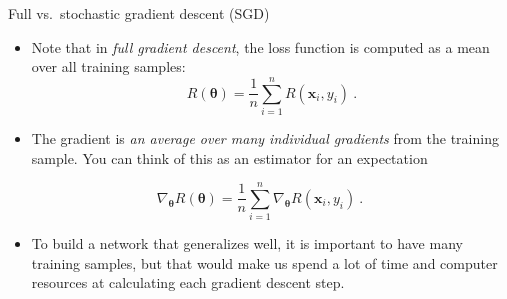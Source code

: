 \documentclass[
  10pt,
  ignorenonframetext,
]{beamer}
\providecommand{\tightlist}{%
  \setlength{\itemsep}{0pt}\setlength{\parskip}{0pt}}
\begin{document}
\begin{frame}
\begin{block}{Full vs.~stochastic gradient descent (SGD)}
\protect\hypertarget{full-vs.-stochastic-gradient-descent-sgd}{}
\(~\)

\begin{itemize}
\item
  Note that in \emph{full gradient descent}, the loss function is
  computed as a mean over all training samples: \[
  R({\boldsymbol \theta})=\frac{1}{n}\sum_{i=1}^n R({\boldsymbol x}_i, y_i) \ .
  \]
\item
  The gradient is \emph{an average over many individual gradients} from
  the training sample. You can think of this as an estimator for an
  expectation
\end{itemize}

\[
\nabla_{\boldsymbol \theta} R({\boldsymbol \theta})=\frac{1}{n}\sum_{i=1}^n \nabla_{\boldsymbol \theta} R({\boldsymbol x}_i, y_i) \ .
\]

\begin{itemize}
\tightlist
\item
  To build a network that generalizes well, it is important to have many
  training samples, but that would make us spend a lot of time and
  computer resources at calculating each gradient descent step.
\end{itemize}
\end{block}
\end{frame}
\end{document}
